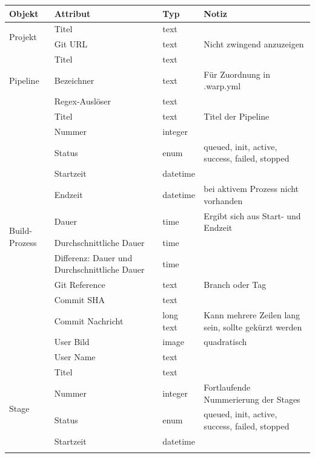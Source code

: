 \begin{table}[H]
  \scriptsize
  \begin{tabularx}{\textwidth}{| l | p{3cm} | l | X |}
    \hline
    \textbf{Objekt} & \textbf{Attribut} & \textbf{Typ} & \textbf{Notiz} \\ \hline
    \multirow{2}{*}{Projekt} & Titel & text &  \\ \cline{2-4}
      & Git URL & text & Nicht zwingend anzuzeigen \\ \hline
    \multirow{3}{*}{Pipeline} & Titel & text &  \\ \cline{2-4}
      & Bezeichner & text & Für Zuordnung in .warp.yml \\ \cline{2-4}
      & Regex-Auslöser & text &   \\ \hline
    \multirow{13}{*}{Build-Prozess} & Titel & text & Titel der Pipeline \\ \cline{2-4}
      & Nummer & integer &  \\ \cline{2-4}
      & Status & enum & queued, init, active, success, failed, stopped \\ \cline{2-4}
      & Startzeit & datetime &  \\ \cline{2-4}
      & Endzeit & datetime & bei aktivem Prozess nicht vorhanden \\ \cline{2-4}
      & Dauer & time & Ergibt sich aus Start- und Endzeit \\ \cline{2-4}
      & Durchschnittliche Dauer & time &  \\ \cline{2-4}
      & Differenz: Dauer und Durchschnittliche Dauer & time &  \\ \cline{2-4}
      & Git Reference & text & Branch oder Tag \\ \cline{2-4}
      & Commit SHA & text &  \\ \cline{2-4}
      & Commit Nachricht & long text & Kann mehrere Zeilen lang sein, sollte gekürzt werden \\ \cline{2-4}
      & User Bild & image & quadratisch \\ \cline{2-4}
      & User Name & text &  \\ \hline
    \multirow{5}{*}{Stage} & Titel & text &  \\ \cline{2-4}
      & Nummer & integer & Fortlaufende Nummerierung der Stages \\ \cline{2-4}
      & Status & enum & queued, init, active, success, failed, stopped \\ \cline{2-4}
      & Startzeit & datetime &  \\ \cline{2-4}

\end{tabularx}
\end{table}
